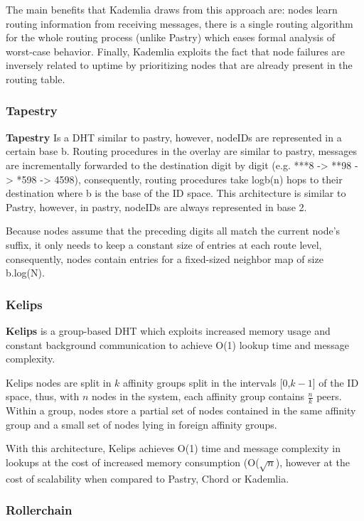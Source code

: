 The main benefits that Kademlia draws from this approach are: nodes learn routing information from receiving messages, there is a single routing algorithm for the whole routing process (unlike Pastry) which eases formal analysis of worst-case behavior. Finally, Kademlia exploits the fact that node failures are inversely related to uptime by prioritizing nodes that are already present in the routing table.

\subsubsection*{Tapestry}

\textbf{Tapestry} \cite{tapestry} Is a DHT similar to pastry, however, nodeIDs are represented in a certain base b. Routing procedures in the overlay are similar to pastry, messages are incrementally forwarded to the destination digit by digit (e.g. ***8 -> **98 -> *598 -> 4598), consequently, routing procedures take logb(n) hops to their destination where b is the base of the ID space. This architecture is similar to Pastry, however, in pastry, nodeIDs are always represented in base 2.

Because nodes assume that the preceding digits all match the current node's suffix, it only needs to keep a constant size of entries at each route level, consequently, nodes contain entries for a fixed-sized neighbor map of size b.log(N).  

\subsubsection*{Kelips}

\textbf{Kelips} \cite{gupta2003kelips} is a group-based DHT which exploits increased memory usage and constant background communication to achieve O(1) lookup time and message complexity. 

Kelips nodes are split in $k$ affinity groups split in the intervals [0,$k-1$] of the ID space, thus, with $n$ nodes in the system, each affinity group contains $\frac{n}{k}$ peers. Within a group, nodes store a partial set of nodes contained in the same affinity group and a small set of nodes lying in foreign affinity groups.

With this architecture, Kelips achieves O(1) time and message complexity in lookups at the cost of increased memory consumption (O($\sqrt{n}$), however at the cost of scalability when compared to Pastry, Chord or Kademlia. 

\subsubsection*{Rollerchain}

